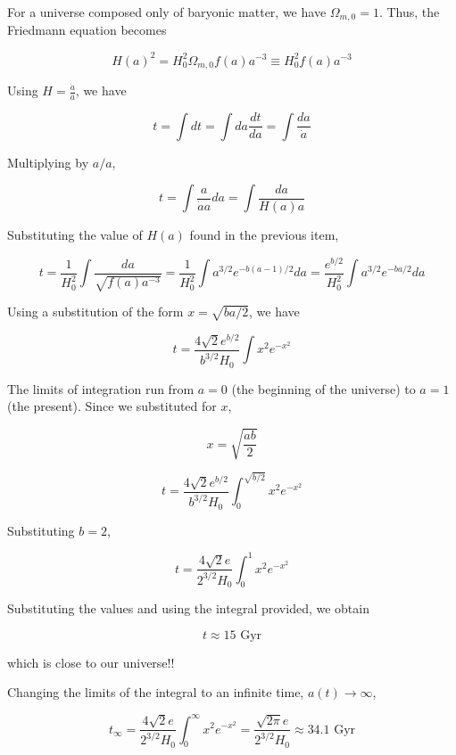 \documentclass[11pt]{article}
\begin{document}
\begin{pproblem}
\begin{pssolution*}{}{ }
\begin{alternativas}
        For a universe composed only of baryonic matter, we have \(\Omega_{m,0} = 1\). Thus, the Friedmann equation becomes

        \[\boxed{H(a)^2 = H_0^2 \Omega_{m,0} f(a) a^{-3} \equiv H_0^2 f(a) a^{-3}}\]

        \item Using \(H = \frac{\dot{a}}{a}\), we have

        \[t = \int dt = \int da \frac{dt}{da} = \int \frac{da}{\dot{a}}\]

        Multiplying by \(a/a\),

        \[t = \int \frac{a}{\dot{a}a} da = \int \frac{da}{H(a) a}\]

        Substituting the value of \(H(a)\) found in the previous item,

        \[t = \frac{1}{H_0^2} \int \frac{da}{\sqrt{f(a) a^{-3}}} = \frac{1}{H_0^2} \int a^{3/2} e^{-b(a-1)/2} da = \frac{e^{b/2}}{H_0^2} \int a^{3/2} e^{-b a/2} da\]
        
        Using a substitution of the form \(x = \sqrt{ba/2}\), we have

        \[t = \frac{4\sqrt{2} e^{b/2}}{b^{3/2} H_0} \int x^2 e^{-x^2}\]

        The limits of integration run from \(a=0\) (the beginning of the universe) to \(a=1\) (the present). Since we substituted for \(x\),

        \[x = \sqrt{\frac{ab}{2}}\]

        \[t = \frac{4\sqrt{2} e^{b/2}}{b^{3/2} H_0} \int_0^{\sqrt{b/2}} x^2 e^{-x^2}\]

        Substituting \(b=2\),

        \[t = \frac{4\sqrt{2} e}{2^{3/2} H_0} \int_0^1 x^2 e^{-x^2}\]

        Substituting the values and using the integral provided, we obtain

        \[\boxed{t \approx 15 \text{ Gyr}}\]

        which is close to our universe!!

        \item Changing the limits of the integral to an infinite time, \(a(t) \rightarrow \infty\),

        \[\boxed{t_\infty = \frac{4\sqrt{2} e}{2^{3/2} H_0} \int_0^{\infty} x^2 e^{-x^2} = \frac{\sqrt{2\pi} e}{2^{3/2} H_0} \approx 34.1 \text{ Gyr}}\]

    \end{alternativas}
\end{pssolution*}
\end{pproblem}
\end{document}
